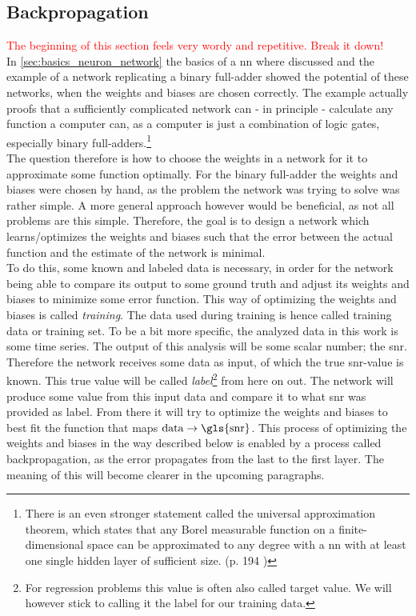 \subsection{Backpropagation}\label{sec:backpropagation}
\textcolor{red}{The beginning of this section feels very wordy and repetitive. Break it down!}\\
In \autoref{sec:basics_neuron_network} the basics of a \gls{nn} where discussed and the example of a network replicating a binary full-adder showed the potential of these networks, when the weights and biases are chosen correctly. The example actually proofs that a sufficiently complicated network can - in principle - calculate any function a computer can, as a computer is just a combination of logic gates, especially binary full-adders.\footnote{There is an even stronger statement called the universal approximation theorem, which states that any Borel measurable function on a finite-dimensional space can be approximated to any degree with a \gls{nn} with at least one single hidden layer of sufficient size. (p. 194 \cite{deep_learning_book})}\cite{deep_learning_beginning}\\
The question therefore is how to choose the weights in a network for it to approximate some function optimally. For the binary full-adder the weights and biases were chosen by hand, as the problem the network was trying to solve was rather simple. A more general approach however would be beneficial, as not all problems are this simple. Therefore, the goal is to design a network which learns/optimizes the weights and biases such that the error between the actual function and the estimate of the network is minimal.\\
To do this, some known and labeled data is necessary, in order for the network being able to compare its output to some ground truth and adjust its weights and biases to minimize some error function. This way of optimizing the weights and biases is called \emph{training}. The data used during training is hence called training data or training set. To be a bit more specific, the analyzed data in this work is some time series. The output of this analysis will be some scalar number; the \gls{snr}. Therefore the network receives some data as input, of which the true \gls{snr}-value is known. This true value will be called \emph{label}\footnote{For regression problems this value is often also called target value. We will however stick to calling it the label for our training data.} from here on out. The network will produce some value from this input data and compare it to what \gls{snr} was provided as label. From there it will try to optimize the weights and biases to best fit the function that maps $\text{data}\to\text{\gls{snr}}$. This process of optimizing the weights and biases in the way described below is enabled by a process called backpropagation, as the error propagates from the last to the first layer. The meaning of this will become clearer in the upcoming paragraphs.\\
